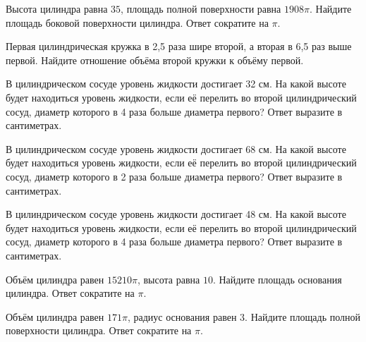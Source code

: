 \documentclass[4apaper]{article}
\begin{document}
\begin{taskBN}{22}
Высота цилиндра равна $35$, площадь полной поверхности равна $1908\pi$. Найдите площадь боковой поверхности цилиндра. Ответ сократите на $\pi$.
\end{taskBN}

\begin{taskBN}{23}
 Первая цилиндрическая кружка в 2,5 раза шире второй, а вторая в 6,5 раз выше первой. Найдите отношение объёма второй кружки к объёму первой.
\end{taskBN}

\begin{taskBN}{24}
В цилиндрическом сосуде уровень жидкости достигает 32 см. На какой высоте будет находиться уровень жидкости, если её перелить во второй цилиндрический сосуд, диаметр которого в 4 раза больше диаметра первого? Ответ выразите в сантиметрах.
\end{taskBN}

\begin{taskBN}{25}
В цилиндрическом сосуде уровень жидкости достигает 68 см. На какой высоте будет находиться уровень жидкости, если её перелить во второй цилиндрический сосуд, диаметр которого в 2 раза больше диаметра первого? Ответ выразите в сантиметрах.
\end{taskBN}

\begin{taskBN}{26}
В цилиндрическом сосуде уровень жидкости достигает 48 см. На какой высоте будет находиться уровень жидкости, если её перелить во второй цилиндрический сосуд, диаметр которого в 4 раза больше диаметра первого? Ответ выразите в сантиметрах.
\end{taskBN}

\begin{taskBN}{27}
Объём цилиндра равен $15210\pi$, высота равна $10$. Найдите площадь основания цилиндра. Ответ сократите на $\pi$.
\end{taskBN}

\begin{taskBN}{28}
Объём цилиндра равен $171\pi$, радиус основания равен $3$. Найдите площадь полной поверхности цилиндра. Ответ сократите на $\pi$.
\end{taskBN}
\end{document}
